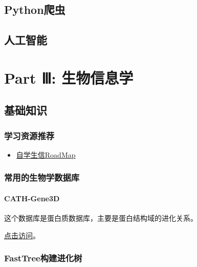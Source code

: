 \documentclass[
  10pt,
]{book}
\providecommand{\tightlist}{%
  \setlength{\itemsep}{0pt}\setlength{\parskip}{0pt}}
\begin{document}
\hypertarget{python-spider}{%
\chapter{Python爬虫}\label{python-spider}}

\hypertarget{ai}{%
\chapter{人工智能}\label{ai}}

\hypertarget{part-part-ux2172-ux751fux7269ux4fe1ux606fux5b66}{%
\part*{Part Ⅲ: 生物信息学}\label{part-part-ux2172-ux751fux7269ux4fe1ux606fux5b66}}

\hypertarget{bio-base}{%
\chapter{基础知识}\label{bio-base}}

\hypertarget{ux5b66ux4e60ux8d44ux6e90ux63a8ux8350}{%
\section{学习资源推荐}\label{ux5b66ux4e60ux8d44ux6e90ux63a8ux8350}}

\begin{itemize}
\tightlist
\item
  \href{https://github.com/ossu/bioinformatics}{自学生信RoadMap}
\end{itemize}

\hypertarget{ux5e38ux7528ux7684ux751fux7269ux5b66ux6570ux636eux5e93}{%
\section{常用的生物学数据库}\label{ux5e38ux7528ux7684ux751fux7269ux5b66ux6570ux636eux5e93}}

\hypertarget{cath-gene3d}{%
\subsection{CATH-Gene3D}\label{cath-gene3d}}

这个数据库是蛋白质数据库，主要是蛋白结构域的进化关系。

\href{https://www.cathdb.info/}{点击访问}。

\hypertarget{fasttreeux6784ux5efaux8fdbux5316ux6811}{%
\section{FastTree构建进化树}\label{fasttreeux6784ux5efaux8fdbux5316ux6811}}
\end{document}
